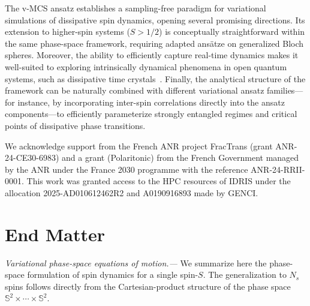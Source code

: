 \documentclass[aps,prl,twocolumn,superscriptaddress,english,floatfix]{revtex4-2}
\begin{document}
The v-MCS ansatz establishes a sampling-free paradigm for variational simulations of dissipative spin dynamics, opening several promising directions. Its extension to higher-spin systems ($S > 1/2$) is conceptually straightforward within the same phase-space framework, requiring adapted ansätze on generalized Bloch spheres. 
Moreover, the ability to efficiently capture real-time dynamics makes it well-suited to exploring intrinsically dynamical phenomena in open quantum systems, such as dissipative time crystals~\cite{ieminiBoundaryTimeCrystals2018, Cabot2022, delmonteMeasurementinducedPhaseTransitions2025}. Finally, the analytical structure of the framework can be naturally combined with different variational ansatz families—for instance, by incorporating inter-spin correlations directly into the ansatz components—to efficiently parameterize strongly entangled regimes and critical points of dissipative phase transitions. 

We acknowledge support from the French ANR project FracTrans (grant ANR-24-CE30-6983) and a grant (Polaritonic) from the French Government managed by the ANR under the France 2030 programme with the reference ANR-24-RRII-0001. This work was granted access to the HPC resources of IDRIS under the allocation 2025-AD010612462R2 and A0190916893 made by GENCI.




\onecolumngrid

\section{End Matter}
\label{EndMatter}
\setcounter{equation}{0}
\setcounter{figure}{0}
\setcounter{table}{0}
\makeatletter
\renewcommand{\theequation}{A\arabic{equation}}
\renewcommand{\thefigure}{A\arabic{figure}}
\twocolumngrid

{\it Variational phase-space equations of motion.---}
We summarize here the phase-space formulation of spin dynamics for a single spin-$S$. The generalization to $N_s$ spins follows directly from the Cartesian-product structure of the phase space $\mathbb{S}^2\times\cdots\times \mathbb{S}^2$.
\end{document}

